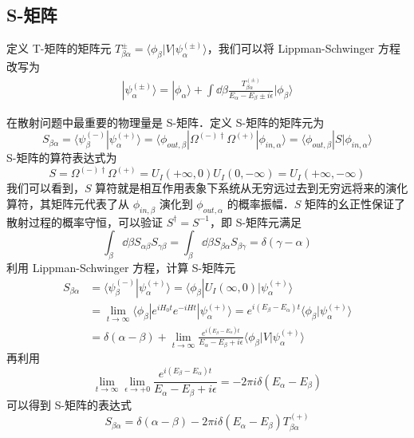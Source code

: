 \subsection{S-矩阵}
定义 T-矩阵的矩阵元 $T_{\beta\alpha}^{\pm}=\langle \phi_\beta|V|\psi_\alpha^{(\pm)}\rangle$，我们可以将 Lippman-Schwinger 方程改写为
\begin{equation}
\begin{aligned}
|\psi_\alpha^{(\pm)}\rangle= |\phi_{\alpha}\rangle+\int \dd\beta \frac{T_{\beta\alpha}^{(\pm)}}{E_\alpha-E_\beta\pm i\epsilon}|\phi_{\beta}\rangle
\end{aligned}
\end{equation}

在散射问题中最重要的物理量是 S-矩阵．定义 S-矩阵的矩阵元为
\begin{equation}
S_{\beta\alpha}=\langle \psi_{\beta}^{(-)}| \psi_{\alpha}^{(+)}\rangle=\langle \phi_{out,\beta}| \Omega^{(-)\dagger}\Omega^{(+)}|\phi_{in,\alpha}\rangle=\langle \phi_{out,\beta}| S |\phi_{in,\alpha}\rangle
\end{equation}
S-矩阵的算符表达式为
\begin{equation}
S=\Omega^{(-)\dagger}\Omega^{(+)}=U_I(+\infty,0)U_I(0,-\infty)=U_I(+\infty,-\infty)
\end{equation}
我们可以看到，$S$ 算符就是相互作用表象下系统从无穷远过去到无穷远将来的演化算符，其矩阵元代表了从 $\phi_{in,\beta}$ 演化到 $\phi_{out,\alpha}$ 的概率振幅．$S$ 矩阵的幺正性保证了散射过程的概率守恒，可以验证 $S^\dagger=S^{-1}$，即 S-矩阵元满足
\begin{equation}
\int_{\beta}\dd \beta S_{\alpha\beta}S_{\gamma\beta}=\int_{\beta}\dd \beta S_{\beta\alpha}S_{\beta\gamma}=\delta(\gamma-\alpha)
\end{equation}
利用 Lippman-Schwinger 方程，计算 S-矩阵元
\begin{equation}
\begin{aligned}
S_{\beta\alpha}&=\langle \psi_{\beta}^{(-)}| \psi_{\alpha}^{(+)}\rangle = \langle \phi_\beta|U_I(\infty,0)|\psi_{\alpha}^{(+)}\rangle\\
&=\lim\limits_{t\rightarrow \infty} \langle \phi_\beta|e^{iH_0 t}e^{-iHt}|\psi_{\alpha}^{(+)}\rangle=e^{i(E_\beta-E_\alpha)t}\langle \phi_\beta|\psi_{\alpha}^{(+)}\rangle\\
&=\delta(\alpha-\beta) + \lim\limits_{t\rightarrow \infty} \frac{e^{i(E_\beta-E_\alpha)t}}{E_\alpha-E_\beta+i\epsilon} \langle \phi_\beta|V|\psi_\alpha^{(+)}\rangle
\end{aligned}
\end{equation}
再利用
\begin{equation}
\lim\limits_{t\rightarrow \infty}\lim\limits_{\epsilon\rightarrow +0} \frac{e^{i(E_\beta-E_\alpha)t}}{E_\alpha-E_\beta+i\epsilon}=-2\pi i \delta(E_\alpha-E_\beta)
\end{equation}
可以得到 S-矩阵的表达式
\begin{equation}
S_{\beta\alpha}=\delta(\alpha-\beta)-2\pi i \delta(E_\alpha-E_\beta)T_{\beta\alpha}^{(+)}
\end{equation}

